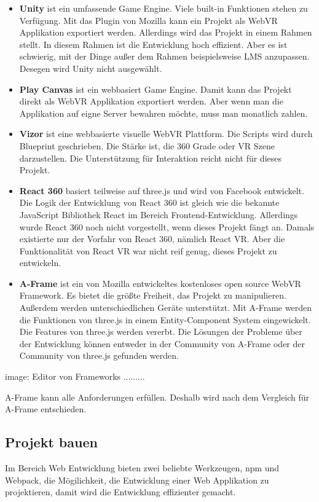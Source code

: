  \begin{itemize}
     \item \textbf{Unity} ist ein umfassende Game Engine. Viele built-in Funktionen stehen zu Verfügung. Mit das Plugin von Mozilla kann ein Projekt als WebVR Applikation exportiert werden. Allerdings wird das Projekt in einem Rahmen stellt. In diesem Rahmen ist die Entwicklung hoch effizient. Aber es ist schwierig, mit der Dinge außer dem Rahmen beispielsweise LMS anzupassen. Desegen wird Unity nicht ausgewählt.
     \item \textbf{Play Canvas} ist ein webbasiert Game Engine. Damit kann das Projekt direkt als WebVR Applikation exportiert werden. Aber wenn man die Applikation auf eigne Server bewahren möchte, muss man monatlich zahlen.
     \item \textbf{Vizor} ist eine webbasierte visuelle WebVR Plattform. Die Scripts wird durch Blueprint geschrieben. Die Stärke ist, die 360 Grade oder VR Szene darzustellen. Die Unterstützung für Interaktion reicht nicht für dieses Projekt.
     \item \textbf{React 360} basiert teilweise auf three.js und wird von Facebook entwickelt. Die Logik der Entwicklung von React 360 ist gleich wie die bekannte JavaScript Bibliothek React im Bereich Frontend-Entwicklung. Allerdings wurde React 360 noch nicht vorgestellt, wenn dieses Projekt fängt an. Damals existierte nur der Vorfahr von React 360, nämlich React VR. Aber die Funktionalität von React VR war nicht reif genug, dieses Projekt zu entwickeln.
     \item \textbf{A-Frame} ist ein von Mozilla entwickeltes kostenloses open source WebVR Framework. Es bietet die größte Freiheit, das Projekt zu manipulieren. Außerdem werden unterschiedlichen Geräte unterstützt. Mit A-Frame werden die Funktionen von three.js in einem Entity-Component System eingewickelt. Die Features von three.js werden vererbt. Die Lösungen der Probleme über der Entwicklung können entweder in der Community von A-Frame oder der Community von three.js gefunden werden.
 \end{itemize}
 
 image: Editor von Frameworks .........
 
 A-Frame kann alle Anforderungen erfüllen. Deshalb wird nach dem Vergleich für A-Frame entschieden.
 
 \subsection{Projekt bauen}
 Im Bereich Web Entwicklung bieten zwei beliebte Werkzeugen, npm und Webpack, die Mögilichkeit, die Entwicklung einer Web Applikation zu projektieren, damit wird die Entwicklung effizienter gemacht. 
 
